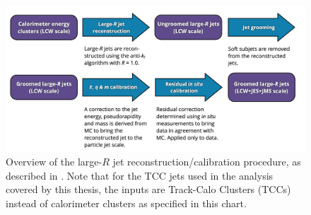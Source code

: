 \begin{figure}
	\centering
	\includegraphics[width=\textwidth]{jet_calibration_flowchart}
	\caption{
	Overview of the large-$R$ jet reconstruction/calibration procedure, as described in \cite{Aaboud:2018kfi}.
	Note that for the TCC jets used in the analysis covered by this thesis, the inputs are Track-Calo Clusters (TCCs) instead of calorimeter clusters as specified in this chart.
	}
	\label{fig:jet_calib_flowchart}
\end{figure}

